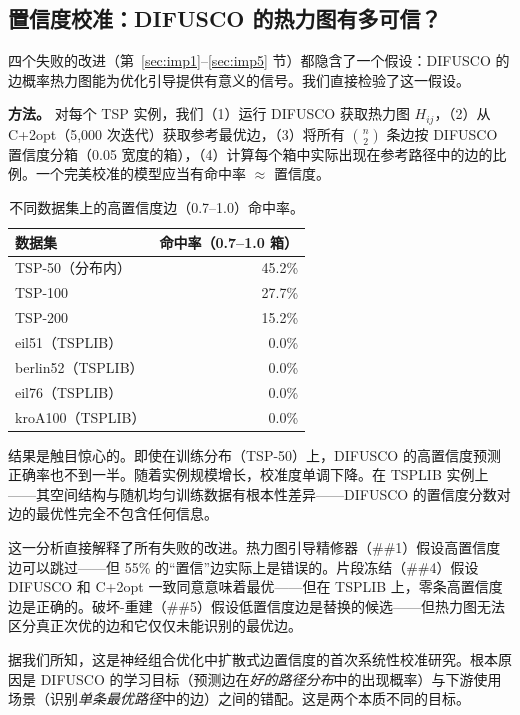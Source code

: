 \documentclass[11pt,a4paper]{ctexart}
\begin{document}
\subsection{置信度校准：DIFUSCO 的热力图有多可信？}
\label{sec:calibration}

四个失败的改进（第~\ref{sec:imp1}--\ref{sec:imp5} 节）都隐含了一个假设：DIFUSCO 的边概率热力图能为优化引导提供有意义的信号。我们直接检验了这一假设。

\textbf{方法。} 对每个 TSP 实例，我们（1）运行 DIFUSCO 获取热力图 $H_{ij}$，（2）从 C+2opt（5,000 次迭代）获取参考最优边，（3）将所有 $\binom{n}{2}$ 条边按 DIFUSCO 置信度分箱（0.05 宽度的箱），（4）计算每个箱中实际出现在参考路径中的边的比例。一个完美校准的模型应当有命中率 $\approx$ 置信度。

\begin{table}[H]
\centering
\small
\caption{不同数据集上的高置信度边（0.7--1.0）命中率。}
\label{tab:calib}
\begin{tabular}{@{}lr@{}}
\toprule
数据集 & 命中率（0.7--1.0 箱）\\
\midrule
TSP-50（分布内） & 45.2\% \\
TSP-100 & 27.7\% \\
TSP-200 & 15.2\% \\
eil51（TSPLIB） & 0.0\% \\
berlin52（TSPLIB） & 0.0\% \\
eil76（TSPLIB） & 0.0\% \\
kroA100（TSPLIB） & 0.0\% \\
\bottomrule
\end{tabular}
\end{table}

结果是触目惊心的。即使在训练分布（TSP-50）上，DIFUSCO 的高置信度预测正确率也不到一半。随着实例规模增长，校准度单调下降。在 TSPLIB 实例上——其空间结构与随机均匀训练数据有根本性差异——DIFUSCO 的置信度分数对边的最优性完全不包含任何信息。

这一分析直接解释了所有失败的改进。热力图引导精修器（\#\#1）假设高置信度边可以跳过——但 55\% 的``置信''边实际上是错误的。片段冻结（\#\#4）假设 DIFUSCO 和 C+2opt 一致同意意味着最优——但在 TSPLIB 上，零条高置信度边是正确的。破坏-重建（\#\#5）假设低置信度边是替换的候选——但热力图无法区分真正次优的边和它仅仅未能识别的最优边。

据我们所知，这是神经组合优化中扩散式边置信度的首次系统性校准研究。根本原因是 DIFUSCO 的学习目标（预测边在\textit{好的路径分布}中的出现概率）与下游使用场景（识别\textit{单条最优路径}中的边）之间的错配。这是两个本质不同的目标。
\end{document}
